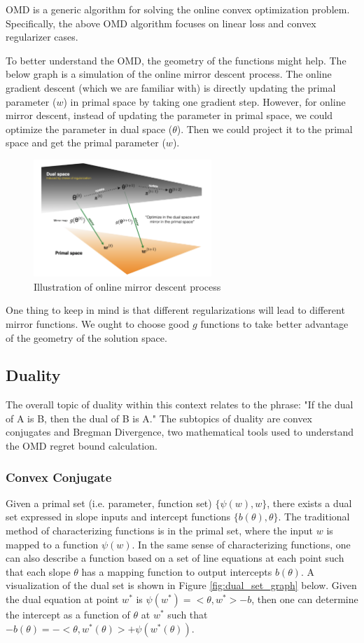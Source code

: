 \documentclass[11pt]{article}
\begin{document}
OMD is a generic algorithm for solving the online convex optimization problem. Specifically, the above OMD algorithm focuses on linear loss and convex regularizer cases.

To better understand the OMD, the geometry of the functions might help. The below graph is a simulation of the online mirror descent process. The online gradient descent (which we are familiar with) is directly updating the primal parameter ($w$) in primal space by taking one gradient step. However, for online mirror descent, instead of updating the parameter in primal space, we could optimize the parameter in dual space ($\theta$). Then we could project it to the primal space and get the primal parameter ($w$). 

\begin{figure}[H]
    \centering
    \includegraphics[width=0.6\textwidth]{geometry.png}
    \caption{Illustration of online mirror descent process}
    \label{fig:dual_primal}
\end{figure}

One thing to keep in mind is that different regularizations will lead to different mirror functions. We ought to choose good $g$ functions to take better advantage of the geometry of the solution space.


\subsection{Duality}
The overall topic of duality within this context relates to the phrase: "If the dual of A is B, then the dual of B is A." The subtopics of duality are convex conjugates and Bregman Divergence, two mathematical tools used to understand the OMD regret bound calculation.

\subsubsection{Convex Conjugate}
Given a primal set (i.e. parameter, function set) $\{ \psi(w), w \}$, there exists a dual set expressed in slope inputs and intercept functions $\{ b(\theta), \theta \}$. The traditional method of characterizing functions is in the primal set, where the input $w$ is mapped to a function $\psi(w)$. In the same sense of characterizing functions, one can also describe a function based on a set of line equations at each point such that each slope $\theta$ has a mapping function to output intercepts $b(\theta)$. A visualization of the dual set is shown in Figure \ref{fig:dual_set_graph} below. Given the dual equation at point $w^*$ is $\psi(w^*) = <\theta, w^*> - b$, then one can determine the intercept as a function of $\theta$ at $w^*$ such that $-b(\theta) = -<\theta, w^*(\theta)> + \psi(w^*(\theta))$.
\end{document}
